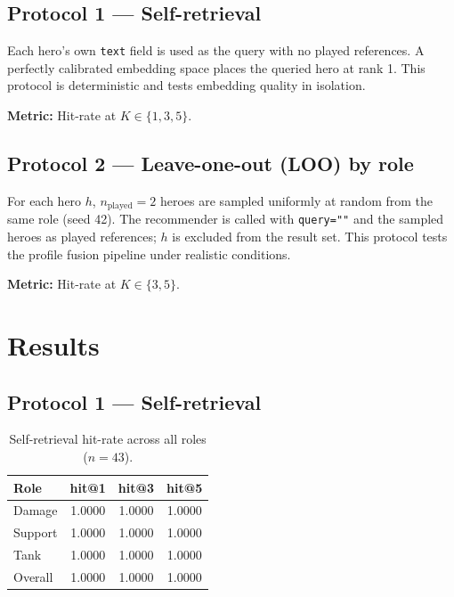 \documentclass[11pt, a4paper]{article}
\begin{document}
\subsection{Protocol 1 — Self-retrieval}

Each hero's own \texttt{text} field is used as the query with no played
references.  A perfectly calibrated embedding space places the queried hero at
rank 1.  This protocol is deterministic and tests embedding quality in
isolation.

\textbf{Metric:} Hit-rate at $K \in \{1, 3, 5\}$.

\subsection{Protocol 2 — Leave-one-out (LOO) by role}

For each hero $h$, $n_\text{played} = 2$ heroes are sampled uniformly at
random from the same role (seed 42).  The recommender is called with
\texttt{query=""} and the sampled heroes as played references;
$h$ is excluded from the result set.  This protocol tests the profile fusion
pipeline under realistic conditions.

\textbf{Metric:} Hit-rate at $K \in \{3, 5\}$.

\section{Results}

\subsection{Protocol 1 — Self-retrieval}

\begin{table}[h]
\centering
\caption{Self-retrieval hit-rate across all roles ($n=43$).}
\begin{tabular}{lccc}
\toprule
Role    & hit@1  & hit@3  & hit@5  \\
\midrule
Damage  & \textcolor{good}{1.0000} & \textcolor{good}{1.0000} & \textcolor{good}{1.0000} \\
Support & \textcolor{good}{1.0000} & \textcolor{good}{1.0000} & \textcolor{good}{1.0000} \\
Tank    & \textcolor{good}{1.0000} & \textcolor{good}{1.0000} & \textcolor{good}{1.0000} \\
\midrule
Overall & \textcolor{good}{1.0000} & \textcolor{good}{1.0000} & \textcolor{good}{1.0000} \\
\bottomrule
\end{tabular}
\end{table}
\end{document}
